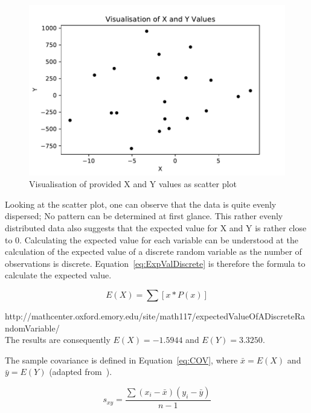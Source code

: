 \begin{figure}[h]
\centering
\includegraphics[width=16cm]{pics/WorkbookAssignment2a.pdf}
\caption{Visualisation of provided X and Y values as scatter plot}
\label{fig:WorkbookAssignment2a}
\end{figure}
\FloatBarrier

Looking at the scatter plot, one can observe that the data is quite evenly dispersed; No pattern can be determined at first glance. This rather evenly distributed data also suggests that the expected value for X and Y is rather close to 0. Calculating the expected value for each variable can be understood at the calculation of the expected value of a discrete random variable as the number of observations is discrete. Equation~\eqref{eq:ExpValDiscrete} is therefore the formula to calculate the expected value. 


\begin{equation}  E(X) = \sum [x * P(x)]
\label{eq:ExpValDiscrete}
\end{equation}

http://mathcenter.oxford.emory.edu/site/math117/expectedValueOfADiscreteRandomVariable/
\\

The results are consequently $E(X) = -1.5944$ and $E(Y) = 3.3250$.

The sample covariance is defined in Equation~\eqref{eq:COV}, where $\bar{x} = E(X)$ and $\bar{y} = E(Y)$ (adapted from~\cite{bruce2017practical}).

\begin{equation}  s_{xy} = \frac{\sum(x_{i}-\bar{x})(y_{i}-\bar{y})}{n-1}
\label{eq:COV}
\end{equation}

